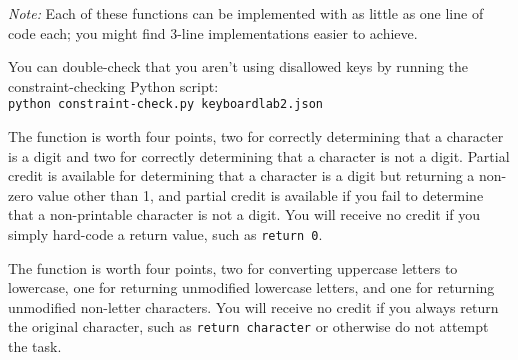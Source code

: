 \textit{Note: } Each of these functions can be implemented with as little as one line of code each;
you might find 3-line implementations easier to achieve.

You can double-check that you aren't using disallowed keys by running the constraint-checking Python script: \\
\texttt{python constraint-check.py keyboardlab2.json}

The  function is worth four points, two for correctly determining that a character is a digit and two for correctly determining that a character is not a digit.
Partial credit is available for determining that a character is a digit but returning a non-zero value other than 1, and partial credit is available if you fail to determine that a non-printable character is not a digit.
You will receive no credit if you simply hard-code a return value, such as \lstinline{return 0}.

The  function is worth four points, two for converting uppercase letters to lowercase, one for returning unmodified lowercase letters, and one for returning unmodified non-letter characters.
You will receive no credit if you always return the original character, such as \lstinline{return character} or otherwise do not attempt the task.
